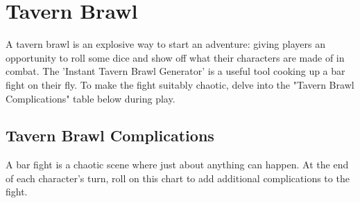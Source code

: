 \documentclass[10pt,a4paper,twoside,twocolumn,openany,bg=print,nodeprecatedcode]{dndbook}
\begin{document}
\section{Tavern Brawl}
A tavern brawl is an explosive way to start an adventure: giving players an opportunity to roll some dice and show off what their characters are made of in combat.
The 'Instant Tavern Brawl Generator' is a useful tool cooking up a bar fight on their fly. To make the fight suitably chaotic, delve into the "Tavern Brawl Complications" table below during play.
\subsection{Tavern Brawl Complications}
A bar fight is a chaotic scene where just about anything can happen. At the end of each character's turn, roll on this chart to add additional complications to the fight.
\end{document}
